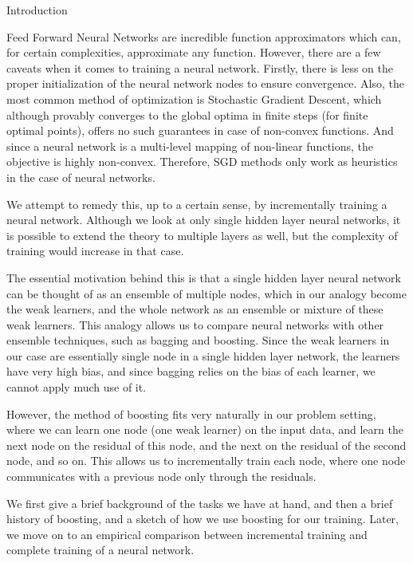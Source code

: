 \documentclass{article}
\begin{document}
\begin{psection}{Introduction}

	Feed Forward Neural Networks are incredible function approximators which can, for certain complexities, approximate any function. However, there are a few caveats when it comes to training a neural network. Firstly, there is less on the proper initialization of the neural network nodes to ensure convergence. Also, the most common method of optimization is Stochastic Gradient Descent, which although provably converges to the global optima in finite steps (for finite optimal points), offers no such guarantees in case of non-convex functions. And since a neural network is a multi-level mapping of non-linear functions, the objective is highly non-convex. Therefore, SGD methods only work as heuristics in the case of neural networks.

	We attempt to remedy this, up to a certain sense, by incrementally training a neural network. Although we look at only single hidden layer neural networks, it is possible to extend the theory to multiple layers as well, but the complexity of training would increase in that case.

	The essential motivation behind this is that a single hidden layer neural network can be thought of as an ensemble of multiple nodes, which in our analogy become the weak learners, and the whole network as an ensemble or mixture of these weak learners. This analogy allows us to compare neural networks with other ensemble techniques, such as bagging and boosting. Since the weak learners in our case are essentially single node in a single hidden layer network, the learners have very high bias, and since bagging relies on the bias of each learner, we cannot apply much use of it.

	However, the method of boosting fits very naturally in our problem setting, where we can learn one node (one weak learner) on the input data, and learn the next node on the residual of this node, and the next on the residual of the second node, and so on. This allows us to incrementally train each node, where one node communicates with a previous node only through the residuals.

	We first give a brief background of the tasks we have at hand, and then a brief history of boosting, and a sketch of how we use boosting for our training. Later, we move on to an empirical comparison between incremental training and complete training of a neural network.

\end{psection}
\end{document}
